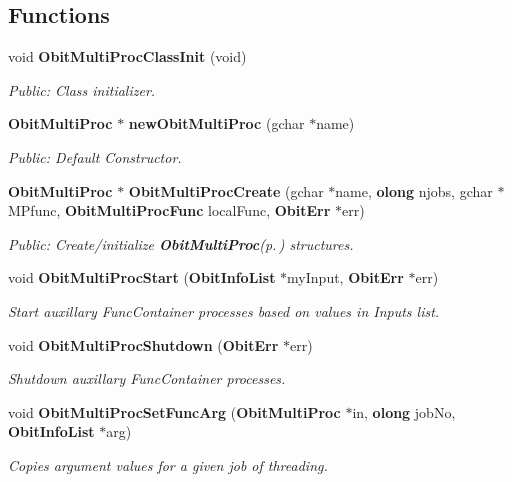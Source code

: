 \subsection*{Functions}
\begin{CompactItemize}
\item 
void {\bf Obit\-Multi\-Proc\-Class\-Init} (void)
\begin{CompactList}\small\item\em Public: Class initializer. \item\end{CompactList}\item 
{\bf Obit\-Multi\-Proc} $\ast$ {\bf new\-Obit\-Multi\-Proc} (gchar $\ast$name)
\begin{CompactList}\small\item\em Public: Default Constructor. \item\end{CompactList}\item 
{\bf Obit\-Multi\-Proc} $\ast$ {\bf Obit\-Multi\-Proc\-Create} (gchar $\ast$name, {\bf olong} njobs, gchar $\ast$MPfunc, {\bf Obit\-Multi\-Proc\-Func} local\-Func, {\bf Obit\-Err} $\ast$err)
\begin{CompactList}\small\item\em Public: Create/initialize {\bf Obit\-Multi\-Proc}{\rm (p.\,\pageref{structObitMultiProc})} structures. \item\end{CompactList}\item 
void {\bf Obit\-Multi\-Proc\-Start} ({\bf Obit\-Info\-List} $\ast$my\-Input, {\bf Obit\-Err} $\ast$err)
\begin{CompactList}\small\item\em Start auxillary Func\-Container processes based on values in Inputs list. \item\end{CompactList}\item 
void {\bf Obit\-Multi\-Proc\-Shutdown} ({\bf Obit\-Err} $\ast$err)
\begin{CompactList}\small\item\em Shutdown auxillary Func\-Container processes. \item\end{CompactList}\item 
void {\bf Obit\-Multi\-Proc\-Set\-Func\-Arg} ({\bf Obit\-Multi\-Proc} $\ast$in, {\bf olong} job\-No, {\bf Obit\-Info\-List} $\ast$arg)
\begin{CompactList}\small\item\em Copies argument values for a given job of threading. \item\end{CompactList}\item 

\end{CompactItemize}
